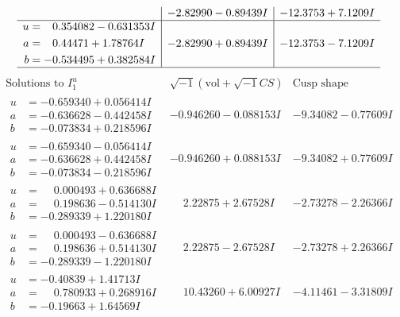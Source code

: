\documentclass[1p]{elsarticle_modified}
\theoremstyle{definition}
\newcommand{\I}{\sqrt{-1}}
\begin{document}
$$\begin{array}{c|c|c}
 & -2.82990 - 0.89439 I & -12.3753 + 7.1209 I \\ \hline\begin{aligned}
u &= \phantom{-}0.354082 - 0.631353 I \\
a &= \phantom{-}0.44471 + 1.78764 I \\
b &= -0.534495 + 0.382584 I\end{aligned}
 & -2.82990 + 0.89439 I & -12.3753 - 7.1209 I\\
 \hline 
 \end{array}$$\newpage$$\begin{array}{c|c|c}  
\text{Solutions to }I^u_{1}& \I (\text{vol} + \sqrt{-1}CS) & \text{Cusp shape}\\
 \hline 
\begin{aligned}
u &= -0.659340 + 0.056414 I \\
a &= -0.636628 - 0.442458 I \\
b &= -0.073834 + 0.218596 I\end{aligned}
 & -0.946260 - 0.088153 I & -9.34082 - 0.77609 I \\ \hline\begin{aligned}
u &= -0.659340 - 0.056414 I \\
a &= -0.636628 + 0.442458 I \\
b &= -0.073834 - 0.218596 I\end{aligned}
 & -0.946260 + 0.088153 I & -9.34082 + 0.77609 I \\ \hline\begin{aligned}
u &= \phantom{-}0.000493 + 0.636688 I \\
a &= \phantom{-}0.198636 - 0.514130 I \\
b &= -0.289339 + 1.220180 I\end{aligned}
 & \phantom{-}2.22875 + 2.67528 I & -2.73278 - 2.26366 I \\ \hline\begin{aligned}
u &= \phantom{-}0.000493 - 0.636688 I \\
a &= \phantom{-}0.198636 + 0.514130 I \\
b &= -0.289339 - 1.220180 I\end{aligned}
 & \phantom{-}2.22875 - 2.67528 I & -2.73278 + 2.26366 I \\ \hline\begin{aligned}
u &= -0.40839 + 1.41713 I \\
a &= \phantom{-}0.780933 + 0.268916 I \\
b &= -0.19663 + 1.64569 I\end{aligned}
 & \phantom{-}10.43260 + 6.00927 I & -4.11461 - 3.31809 I \\ \hline\begin{aligned}

\end{aligned}
\end{array}$$
\end{document}
